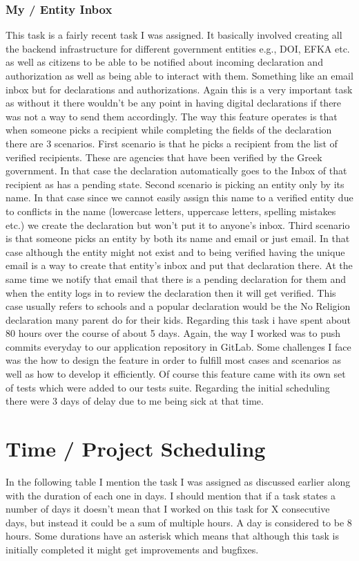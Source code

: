 \subsubsection{My / Entity Inbox}
This task is a fairly recent task I was assigned. It basically involved creating all the backend infrastructure for different government entities e.g., DOI, EFKA etc. as well as citizens to be able
to be notified about incoming declaration and authorization as well as being able to interact with them. Something like an email inbox but for declarations and authorizations. Again this is a very important task as without it there wouldn't be any point in having digital declarations if there was not a way to send them accordingly. The way this feature operates is that when someone picks a recipient while completing the fields of the declaration there are 3 scenarios. First scenario is that he picks a recipient from the list of verified recipients. These are agencies that have been verified by the Greek government. In that case the declaration automatically goes to the Inbox of that recipient as has a pending state. Second scenario is picking an entity only by its name. In that case since we cannot easily assign this name to a verified entity due to conflicts in the name (lowercase letters, uppercase letters, spelling mistakes etc.) we create the declaration but won't put it to anyone's inbox. Third scenario is that someone picks an entity by both its name and email or just email. In that case although the entity might not exist and to being verified having the unique email is a way to create that entity's inbox and put that declaration there. At the same time we notify that email that there is a pending declaration for them and when the entity logs in to review the declaration then it will get verified. This case usually refers to schools and a popular declaration would be the No Religion declaration many parent do for their kids. Regarding this task
i have spent about 80 hours over the course of about 5 days. Again, the way I worked was to push commits everyday to our application repository in GitLab. Some challenges I face was the how to design the feature in order to fulfill most cases and scenarios as well as how to develop it efficiently. Of course this feature came with its own set of tests which were added to our tests suite. Regarding the initial scheduling there were 3 days of delay due to me being sick at that time.

\section{Time / Project Scheduling}
In the following table I mention the task I was assigned as discussed earlier along with the
duration of each one in days. I should mention that if a task states a number of days it doesn't mean
that I worked on this task for X consecutive days, but instead it could be a sum of multiple hours.
A day is considered to be 8 hours. Some durations have an asterisk which means that although this task is initially completed it might get improvements and bugfixes.

